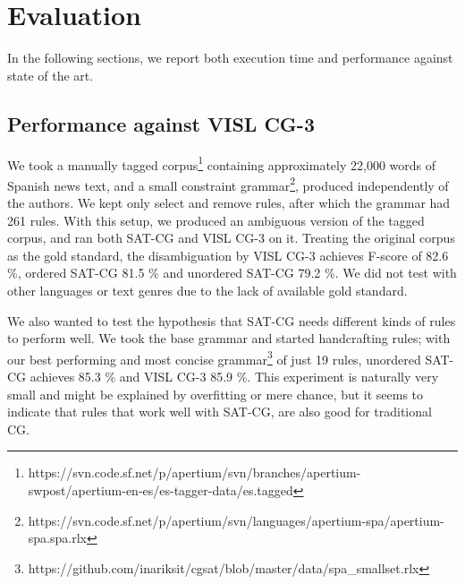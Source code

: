 \documentclass[11pt]{article}
\begin{document}
\section{Evaluation}
\label{sec:eval}

In the following sections, we report both execution time and
performance against state of the art.




\subsection{Performance against VISL CG-3}


We took a manually tagged
corpus\footnote{https://svn.code.sf.net/p/apertium/svn/branches/apertium-swpost/apertium-en-es/es-tagger-data/es.tagged}
containing approximately 22,000 words of Spanish news text, 
and a small constraint grammar\footnote{https://svn.code.sf.net/p/apertium/svn/languages/apertium-spa/apertium-spa.spa.rlx}, produced independently of the authors.
We kept only select and remove rules, after which the grammar had 261 rules.
With this setup, we produced an ambiguous version of the tagged
corpus, and ran both SAT-CG and VISL CG-3 on it.
Treating the original corpus as the gold standard, the disambiguation
by  VISL CG-3 achieves F-score of 82.6 \%, ordered SAT-CG 81.5 \%  and
unordered SAT-CG 79.2 \%. 
We did not test with other languages or text genres due to the lack of
available gold standard.

We also wanted to test the hypothesis that SAT-CG needs different
kinds of rules to perform well. We took the base grammar and started
handcrafting rules; with our best performing and most concise
grammar\footnote{https://github.com/inariksit/cgsat/blob/master/data/spa\_smallset.rlx}
of just 19 rules, unordered SAT-CG achieves 85.3 \% and VISL CG-3 85.9
\%. This experiment is naturally very small and might be explained by
overfitting or mere chance, but it seems to indicate that rules that
work well with SAT-CG, are also good for traditional CG.
\end{document}
